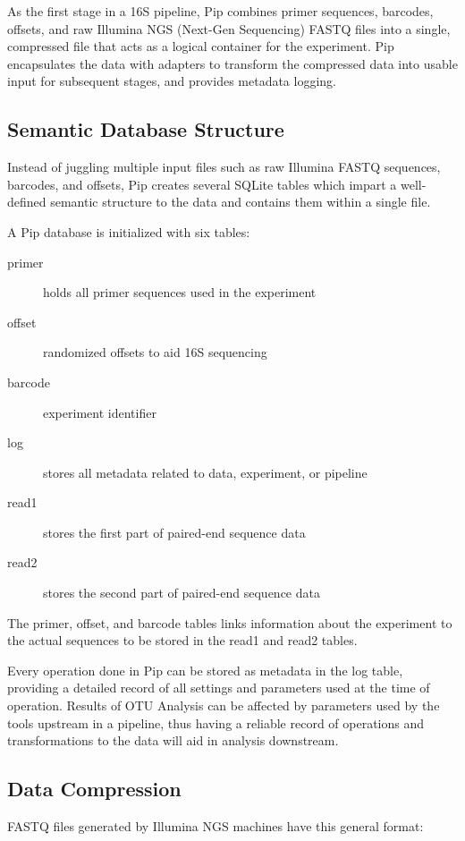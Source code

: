\documentclass[12pt]{article}
\begin{document}
	As the first stage in a 16S pipeline, Pip combines primer sequences, barcodes, 
	offsets, and raw Illumina NGS (Next-Gen Sequencing) FASTQ files into a single, 
	compressed file that acts as a logical container for the experiment. Pip 
	encapsulates the data with adapters to transform the compressed data into 
	usable input for subsequent stages, and provides metadata logging.

	\subsection{Semantic Database Structure} %
	\label{sub:semantic_database_structure}
	Instead of juggling multiple input files such as raw Illumina FASTQ sequences,
	barcodes, and offsets, Pip creates several SQLite tables which impart a well-defined
	semantic structure to the data and contains them within a single file.
	
	A Pip database is initialized with six tables:
	
	\begin{description}
		\item[primer] holds all primer sequences used in the experiment
		\item[offset] randomized offsets to aid 16S sequencing
		\item[barcode] experiment identifier
		\item[log] stores all metadata related to data, experiment, or pipeline
		\item[read1] stores the first part of paired-end sequence data
		\item[read2] stores the second part of paired-end sequence data
	\end{description}
	
	The primer, offset, and barcode tables links information about the experiment 
	to the actual sequences to be stored in the read1 and read2 tables.
	
	Every operation done in Pip can be stored as metadata in the log table, providing a
	detailed record of all settings and parameters used at the time of operation. 
	Results of OTU Analysis can be affected by parameters used by the tools upstream
	in a pipeline, thus having a reliable record of operations and transformations
	to the data will aid in analysis downstream.


	\subsection{Data Compression} %
	\label{sub:data_compression}
	FASTQ files generated by Illumina NGS machines have this general format:
	
\end{document}
